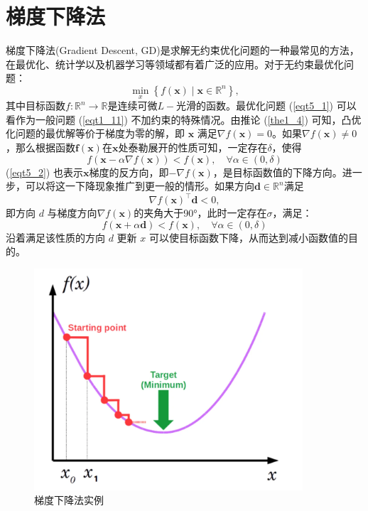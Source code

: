 \section{梯度下降法}梯度下降法(Gradient Descent, GD)是求解无约束优化问题的一种最常见的方法\cite{6302929}，在最优化、统计学以及机器学习等领域都有着广泛的应用。对于无约束最优化问题：
\begin{equation}
    \min _{x}\left\{f(\bm{x}) \mid \bm{x} \in \mathbb{R}^{n}\right\} ,
    \label{eqt5_1}
\end{equation}
其中目标函数$f: \mathbb{R}^{n} \rightarrow \mathbb{R}$是连续可微$L-$光滑的函数。最优化问题 (\ref{eqt5_1}) 可以看作为一般问题 (\ref{eqt1_11}) 不加约束的特殊情况。由推论 (\ref{the1_4}) 可知，凸优化问题的最优解等价于梯度为零的解，即 $\bm{x}$ 满足$\nabla f(\bm{x})=0$。如果$\nabla f(\bm{x}) \neq 0$，那么根据函数$\bm{f(\bm{x})}$在$\bm{x}$处泰勒展开的性质可知，一定存在$\delta$，使得
\begin{equation}
    f(\bm{x}-\alpha \nabla f(\bm{x}))<f(\bm{x}), \quad \forall \alpha \in(0, \delta)
    \label{eqt5_2}
\end{equation}
(\ref{eqt5_2}) 也表示$\bm{x}$梯度的反方向，即$-\nabla f(\bm{x})$，是目标函数值的下降方向。进一步，可以将这一下降现象推广到更一般的情形。如果方向$\bm{d} \in \mathbb{R}^{n}$满足
\begin{equation}
    \nabla f(\bm{x})^{\top} \bm{d}<0 ,
    \nonumber
\end{equation}
即方向 $d$ 与梯度方向$\nabla f(\bm{x})$的夹角大于90°，此时一定存在$\sigma$，满足：
\begin{equation}
    f(\bm{x}+\alpha \bm{d})<f(\bm{x}), \quad \forall \alpha \in(0, \delta)
    \label{eqt5_3}
\end{equation}
沿着满足该性质的方向 $d$ 更新 $x$ 可以使目标函数下降，从而达到减小函数值的目的。
\begin{figure}[hbtp]
        \centering
        \includegraphics[width=100mm]{./Figures/gd-emp.png}
        \caption{梯度下降法实例}
        \label{figure_gd_emp}
    \end{figure}

